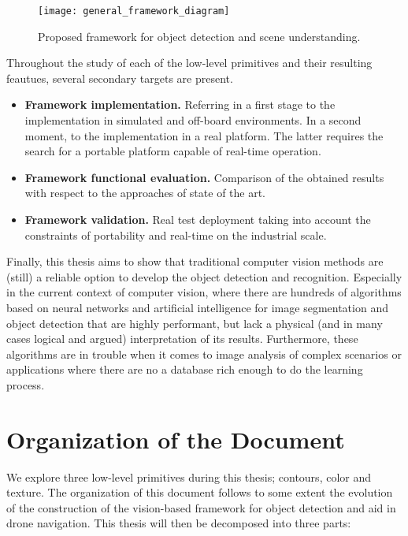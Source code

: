 \begin{figure}[!ht]
    \centering
    \texttt{[image: general\_framework\_diagram]}        
    \caption{Proposed framework for object detection and scene understanding.}\label{fig:general_diagram_framework}
\end{figure}

Throughout the study of each of the low-level primitives and their resulting feautues, several secondary targets are present.

\begin{itemize}
	\item \textbf{Framework implementation.} Referring in a first stage to the implementation in simulated and off-board environments. In a second moment, to the implementation in a real platform. The latter requires the search for a portable platform capable of real-time operation.
 
	\item \textbf{Framework functional evaluation.} Comparison of the obtained results with respect to the approaches of state of the art.
 
 	\item \textbf{Framework validation.} Real test deployment taking into account the constraints of portability and real-time on the industrial scale.
 
\end{itemize}

Finally, this thesis aims to show that traditional computer vision methods are (still) a reliable option to develop the object detection and recognition. Especially in the current context of computer vision, where there are hundreds of algorithms based on neural networks and artificial intelligence for image segmentation and object detection that are highly performant, but lack a physical (and in many cases logical and argued) interpretation of its results. Furthermore, these algorithms are in trouble when it comes to image analysis of complex scenarios or applications where there are no a database rich enough to do the learning process.


\section*{Organization of the Document}
We explore three low-level primitives during this thesis; contours, color and texture. The organization of this document follows to some extent the evolution of the construction of the vision-based framework for object detection and aid in drone navigation. This thesis will then be decomposed into three parts:


